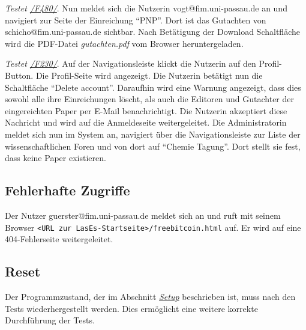 \begin{description}

	 \emph{Testet \hyperref[funkt:480]{/F480/}}.
	Nun meldet sich die Nutzerin vogt@fim.uni-passau.de an und navigiert zur Seite der Einreichung ``P\neq NP''.
	Dort ist das Gutachten von schicho@fim.uni-passau.de sichtbar.
	Nach Betätigung der Download Schaltfläche wird die PDF-Datei \emph{gutachten.pdf} vom Browser heruntergeladen.

	 \emph{Testet \hyperref[funkt:230]{/F230/}}.
	Auf der Navigationsleiste klickt die Nutzerin auf den Profil-Button.
	Die Profil-Seite wird angezeigt.
	Die Nutzerin betätigt nun die Schaltfläche ``Delete account''.
	Daraufhin wird eine Warnung angezeigt, dass dies sowohl alle ihre Einreichungen löscht, als auch die Editoren und Gutachter der eingereichten Paper per E-Mail benachrichtigt.
	Die Nutzerin akzeptiert diese Nachricht und wird auf die Anmeldeseite weitergeleitet.
	Die Administratorin meldet sich nun im System an, navigiert über die Navigationsleiste zur Liste der wissenschaftlichen Foren und von dort auf ``Chemie Tagung''.
	Dort stellt sie fest, dass keine Paper existieren.

\end{description}

\subsection{Fehlerhafte Zugriffe}

\begin{description}
	Der Nutzer guerster@fim.uni-passau.de meldet sich an und ruft mit seinem Browser \texttt{<URL zur LasEs-Startseite>/freebitcoin.html} auf.
	Er wird auf eine 404-Fehlerseite weitergeleitet.
\end{description}

\subsection{Reset}
Der Programmzustand, der im Abschnitt \emph{\hyperref[setup]{Setup}} beschrieben ist, muss nach den Tests wiederhergestellt werden.
Dies ermöglicht eine weitere korrekte Durchführung der Tests.



